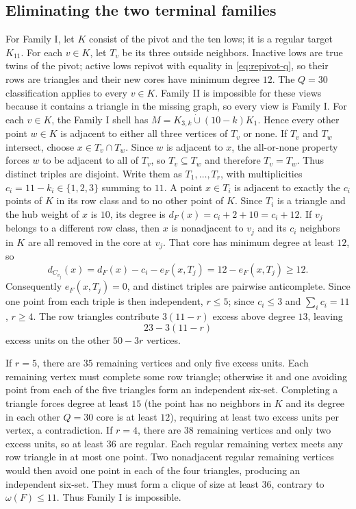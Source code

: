 \subsection{Eliminating the two terminal families}

For Family I, let $K$ consist of the pivot and the ten lows; it is a regular target $K_{11}$. For each $v\in K$, let $T_v$ be its three outside neighbors. Inactive lows are true twins of the pivot; active lows repivot with equality in \cref{eq:repivot-q}, so their rows are triangles and their new cores have minimum degree $12$. The $Q=30$ classification applies to every $v\in K$. Family II is impossible for these views because it contains a triangle in the missing graph, so every view is Family I. For each $v\in K$, the Family I shell has $M=K_{3,k}\dot\cup(10-k)K_1$. Hence every other point $w\in K$ is adjacent to either all three vertices of $T_v$ or none. If $T_v$ and $T_w$ intersect, choose $x\in T_v\cap T_w$. Since $w$ is adjacent to $x$, the all-or-none property forces $w$ to be adjacent to all of $T_v$, so $T_v\subseteq T_w$ and therefore $T_v=T_w$. Thus distinct triples are disjoint. Write them as $T_1,\ldots,T_r$, with multiplicities $c_i=11-k_i\in\{1,2,3\}$ summing to $11$. A point $x\in T_i$ is adjacent to exactly the $c_i$ points of $K$ in its row class and to no other point of $K$. Since $T_i$ is a triangle and the hub weight of $x$ is $10$, its degree is $d_F(x)=c_i+2+10=c_i+12$. If $v_j$ belongs to a different row class, then $x$ is nonadjacent to $v_j$ and its $c_i$ neighbors in $K$ are all removed in the core at $v_j$. That core has minimum degree at least $12$, so
\[
d_{C_{v_j}}(x)=d_F(x)-c_i-e_F(x,T_j)=12-e_F(x,T_j)\geq12.
\]
Consequently $e_F(x,T_j)=0$, and distinct triples are pairwise anticomplete. Since one point from each triple is then independent, $r\leq5$; since $c_i\leq3$ and $\sum_i c_i=11$, $r\geq4$. The row triangles contribute $3(11-r)$ excess above degree $13$, leaving
\[
23-3(11-r)
\]
excess units on the other $50-3r$ vertices.

If $r=5$, there are $35$ remaining vertices and only five excess units. Each remaining vertex must complete some row triangle; otherwise it and one avoiding point from each of the five triangles form an independent six-set. Completing a triangle forces degree at least $15$ (the point has no neighbors in $K$ and its degree in each other $Q=30$ core is at least $12$), requiring at least two excess units per vertex, a contradiction. If $r=4$, there are $38$ remaining vertices and only two excess units, so at least $36$ are regular. Each regular remaining vertex meets any row triangle in at most one point. Two nonadjacent regular remaining vertices would then avoid one point in each of the four triangles, producing an independent six-set. They must form a clique of size at least $36$, contrary to $\omega(F)\leq11$. Thus Family I is impossible.

